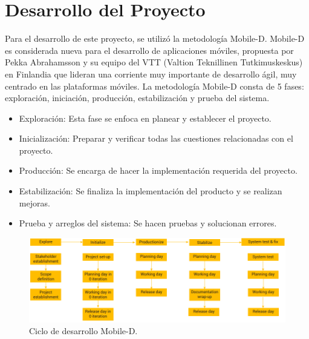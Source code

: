 \documentclass[12pt,letterpaper,openany]{book}
\begin{document}

\chapter{Desarrollo del Proyecto}\label{cap.desarrollo_del_proyecto}
Para el desarrollo de este proyecto, se utilizó la metodología Mobile-D.
Mobile-D es considerada nueva para el desarrollo de aplicaciones móviles, propuesta por Pekka Abrahamsson y su equipo del VTT (Valtion Teknillinen Tutkimuskeskus) en Finlandia que lideran una corriente muy importante de desarrollo ágil, muy centrado en las plataformas móviles.
La metodología Mobile-D consta de 5 fases: exploración, iniciación, producción, estabilización y prueba del sistema. 
\begin{itemize}
    \item Exploración: Esta fase se enfoca en planear y establecer el proyecto. 
    \item Inicialización: Preparar y verificar todas las cuestiones relacionadas con el proyecto. 
    \item Producción: Se encarga de hacer la implementación requerida del proyecto. 
    \item Estabilización: Se finaliza la implementación del producto y se realizan mejoras. 
    \item Prueba y arreglos del sistema: Se hacen pruebas y solucionan errores.
\end{itemize}

\begin{figure}[H]
\begin{center}
\includegraphics[width=16cm]{./imagenes/ciclo_desarrollo}
\caption{Ciclo de desarrollo Mobile-D.}
\end{center}
\end{figure}
\end{document}
